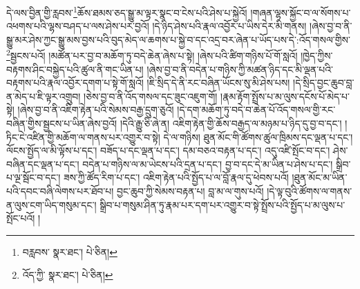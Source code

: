 དེ་ལས་བྱིན་གྱི་རླབས་\footnote{བརླབས་  སྣར་ཐང་།  པེ་ཅིན། }ཆོས་ཐམས་ཅད་སྒྱུ་མ་ལྟར་སྣང་བ་ངེས་པའི་ཤེས་པ་སྐྱེའོ། །གཞན་ལྷས་སྐྱོང་བ་ལ་སོགས་པ་འཕགས་པའི་ལྷས་བཤད་པ་ལས་ཤེས་པར་བྱའོ། །དེ་ཉིད་ཤེས་པའི་རྣལ་འབྱོར་པ་ཡིས་དེར་མི་གནས། །ཞེས་བྱ་བ་ནི་སྒྱུ་མར་ཤེས་ཀྱང་སྒྱུ་མས་བྱས་པའི་བུད་མེད་ལ་ཆགས་པ་སྐྱེ་བ་དང་འདྲ་བར་ཞེན་པ་ཡོད་པས་དེ་:འོད་གསལ་གྱིས་\footnote{འོད་ཀྱི་  སྣར་ཐང་།  པེ་ཅིན། }སྦྱངས་པའོ། །མཚོན་པར་བྱ་བ་མཆོག་ཏུ་བདེ་ཆེན་ཞེས་པ་སྟེ། །ཞེས་པའི་ཚིག་གཉིས་པོ་གོ་སླའོ། །ཁྱེད་ཀྱིས་བརྟགས་ཤིང་བསྐྱེད་པའི་ཚུལ་ནི་གང་ཡིན་པ། །ཞེས་བྱ་བ་ནི་བདེན་པ་གཉིས་ཀྱི་མཚན་ཉིད་དང་མི་ལྡན་པའི་བརྟགས་པའི་རྣལ་འབྱོར་དགག་པ་སྟེ་གོ་སླའོ། །ཇི་སྲིད་དེ་ནི་རང་བཞིན་ཡོངས་སུ་མི་ཤེས་པས། །དེ་སྲིད་བྱང་ཆུབ་བླ་ན་མེད་པ་ཇི་ལྟར་འགྲུབ། །ཅེས་བྱ་བ་ནི་འོད་གསལ་དང་ཟུང་འཇུག་གོ། །རྣམ་རྟོག་སྤྲོས་པ་མ་ལུས་དངོས་པོ་མེད་པ་སྟེ། །ཞེས་བྱ་བ་ནི་འཇིག་རྟེན་པའི་སེམས་བརྒྱ་དྲུག་ཅུའོ། །དེ་དག་མཆོག་ཏུ་བདེ་བ་ཆེན་པོ་འོད་གསལ་གྱི་རང་བཞིན་གྱིས་སྦྱངས་པ་ཡིན་ཞེས་བྱའོ། །དེའི་རྒྱུ་ཅི་ཞེ་ན། འཇིག་རྟེན་གྱི་ཆོས་བརྒྱད་ལ་མཉམ་པ་ཉིད་དུ་བྱ་བ་དང་། །ཏིང་ངེ་འཛིན་གྱི་མཆོག་ལ་གནས་པར་འགྱུར་བ་སྟེ། དེ་ལ་གཉིས། ཐུན་མོང་གི་ཚོགས་ཚུལ་ཁྲིམས་དང་ལྡན་པ་དང་། ལོངས་སྤྱོད་ལ་མི་ལྟོས་པ་དང་། བཟོད་པ་དང་ལྡན་པ་དང་། དམ་བཅའ་བརྟན་པ་དང་། འདུ་འཛི་སྤོང་བ་དང་། ཤེས་བཞིན་དང་ལྡན་པ་དང་། བདེན་པ་གཉིས་ལ་མ་ཡེངས་པའི་དྲན་པ་དང་། བྱ་བ་དང་དེ་མ་ཡིན་པ་ཤེས་པ་དང་། སྒྲིབ་པ་ལྔ་སྦོང་བ་དང་། ཟས་ཀྱི་ཚོད་རིག་པ་དང་། འཇིག་རྟེན་པའི་སྤྱོད་པ་ལ་བློ་རྣལ་དུ་ཕེབས་པའོ། །ཐུན་མོང་མ་ཡིན་པའི་དབང་བཞི་ལེགས་པར་ཐོབ་པ། བྱང་ཆུབ་ཀྱི་སེམས་བརྟན་པ། བླ་མ་ལ་གུས་པའོ། །དེ་ལྟ་བུའི་ཚོགས་ལ་གནས་ན་ལུས་ངག་ཡིད་གསུམ་དང་། སྒྲིབ་པ་གསུམ་ཤིན་ཏུ་རྣམ་པར་དག་པར་འགྱུར་བ་སྟེ་སྤྲོས་པའི་སྤྱོད་པ་མ་ལུས་པ་སྤོང་པའོ། །
